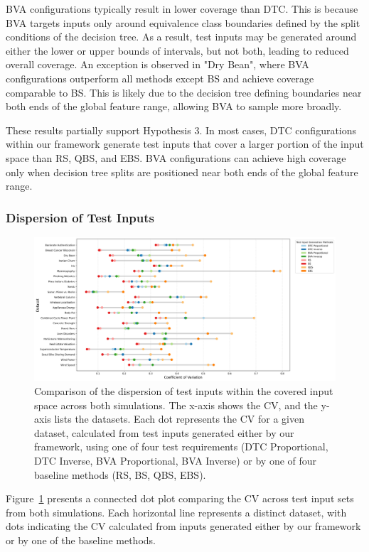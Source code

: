 \documentclass[
]{ceurart}
\theoremstyle{definition}
\begin{document}
BVA configurations typically result in lower coverage than DTC. This is because BVA targets inputs only around equivalence class boundaries defined by the split conditions of the decision tree. As a result, test inputs may be generated around either the lower or upper bounds of intervals, but not both, leading to reduced overall coverage. An exception is observed in "Dry Bean", where BVA configurations outperform all methods except BS and achieve coverage comparable to BS. This is likely due to the decision tree defining boundaries near both ends of the global feature range, allowing BVA to sample more broadly.

These results partially support Hypothesis 3. In most cases, DTC configurations within our framework generate test inputs that cover a larger portion of the input space than RS, QBS, and EBS. BVA configurations can achieve high coverage only when decision tree splits are positioned near both ends of the global feature range.

\subsubsection{Dispersion of Test Inputs}
\begin{figure}
\centering
\includegraphics[width=\linewidth]{img/cv_plot}
\caption{Comparison of the dispersion of test inputs within the covered input space across both simulations. The x-axis shows the CV, and the y-axis lists the datasets. Each dot represents the CV for a given dataset, calculated from test inputs generated either by our framework, using one of four test requirements (DTC Proportional, DTC Inverse, BVA Proportional, BVA Inverse) or by one of four baseline methods (RS, BS, QBS, EBS).}
\label{fig:cv}
\end{figure}

Figure~\ref{fig:cv} presents a connected dot plot comparing the CV across test input sets from both simulations. Each horizontal line represents a distinct dataset, with dots indicating the CV calculated from inputs generated either by our framework or by one of the baseline methods.
\end{document}
